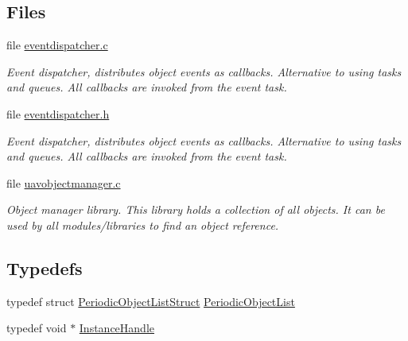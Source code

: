\subsection*{\-Files}
\begin{DoxyCompactItemize}
\item 
file \hyperlink{eventdispatcher_8c}{eventdispatcher.\-c}
\begin{DoxyCompactList}\small\item\em \-Event dispatcher, distributes object events as callbacks. \-Alternative to using tasks and queues. \-All callbacks are invoked from the event task. \end{DoxyCompactList}\item 
file \hyperlink{eventdispatcher_8h}{eventdispatcher.\-h}
\begin{DoxyCompactList}\small\item\em \-Event dispatcher, distributes object events as callbacks. \-Alternative to using tasks and queues. \-All callbacks are invoked from the event task. \end{DoxyCompactList}\item 
file \hyperlink{uavobjectmanager_8c}{uavobjectmanager.\-c}
\begin{DoxyCompactList}\small\item\em \-Object manager library. \-This library holds a collection of all objects. \-It can be used by all modules/libraries to find an object reference. \end{DoxyCompactList}\end{DoxyCompactItemize}
\subsection*{\-Typedefs}
\begin{DoxyCompactItemize}
\item 
typedef struct \*
\hyperlink{struct_periodic_object_list_struct}{\-Periodic\-Object\-List\-Struct} \hyperlink{group___u_a_v_object_handling_ga3da0c8782a25b0b174e36b9f80d02183}{\-Periodic\-Object\-List}
\item 
typedef void $\ast$ \hyperlink{group___u_a_v_object_handling_gabd5387dedf4d32f408b532b19fcdc1da}{\-Instance\-Handle}
\end{DoxyCompactItemize}
